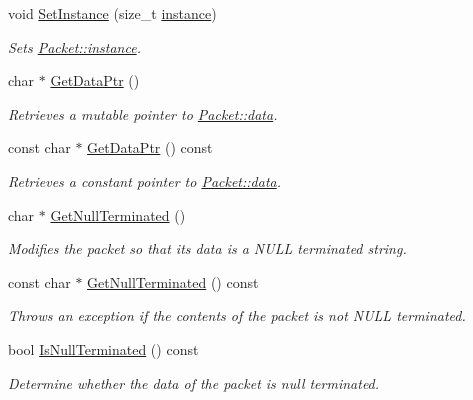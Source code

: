 \begin{DoxyCompactItemize}
void \hyperlink{class_packet_a1829784ec417688a1522ee4815ddda73}{SetInstance} (size\_\-t \hyperlink{class_packet_afce0ae0cb900f81df3cb1aaa2d197495}{instance})
\begin{DoxyCompactList}\small\item\em Sets \hyperlink{class_packet_afce0ae0cb900f81df3cb1aaa2d197495}{Packet::instance}. \item\end{DoxyCompactList}\item 
char $\ast$ \hyperlink{class_packet_a5cd834326344e1de941a122ec1cc21ce}{GetDataPtr} ()
\begin{DoxyCompactList}\small\item\em Retrieves a mutable pointer to \hyperlink{class_packet_a6ce50b69127890b9012cb91f287f137f}{Packet::data}. \item\end{DoxyCompactList}\item 
const char $\ast$ \hyperlink{class_packet_aac86d0fa93713d18ff931ef1deafd924}{GetDataPtr} () const 
\begin{DoxyCompactList}\small\item\em Retrieves a constant pointer to \hyperlink{class_packet_a6ce50b69127890b9012cb91f287f137f}{Packet::data}. \item\end{DoxyCompactList}\item 
char $\ast$ \hyperlink{class_packet_a366951c2268a1e7745802ef9ed28dc28}{GetNullTerminated} ()
\begin{DoxyCompactList}\small\item\em Modifies the packet so that its data is a NULL terminated string. \item\end{DoxyCompactList}\item 
const char $\ast$ \hyperlink{class_packet_ac35aada76c25f06260afff9e0fd54552}{GetNullTerminated} () const 
\begin{DoxyCompactList}\small\item\em Throws an exception if the contents of the packet is not NULL terminated. \item\end{DoxyCompactList}\item 
bool \hyperlink{class_packet_a538a7c5b42aa2b17697ed0d3f65bd0ac}{IsNullTerminated} () const 
\begin{DoxyCompactList}\small\item\em Determine whether the data of the packet is null terminated. \item\end{DoxyCompactList}\item 

\end{DoxyCompactItemize}
